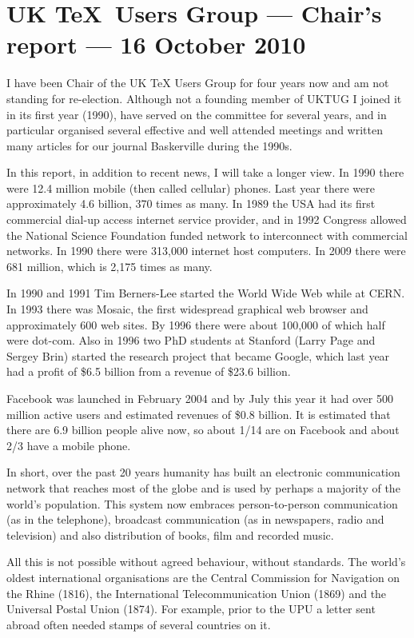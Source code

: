 \documentclass[11pt,a4paper]{article}
\begin{document}
\section*{UK \TeX\ Users Group --- Chair's report --- 16 October 2010}


I have been Chair of the UK TeX Users Group for four years now and am
not standing for re-election.  Although not a founding member of UKTUG
I joined it in its first year (1990), have served on the committee for
several years, and in particular organised several effective and well
attended meetings and written many articles for our journal
Baskerville during the 1990s.

In this report, in addition to recent news, I will take a longer view.
In 1990 there were 12.4 million mobile (then called cellular) phones.
Last year there were approximately 4.6 billion, 370 times as many.  In
1989 the USA had its first commercial dial-up access internet service
provider, and in 1992 Congress allowed the National Science Foundation
funded network to interconnect with commercial networks.  In 1990
there were 313,000 internet host computers.  In 2009 there were 681
million, which is 2,175 times as many.

In 1990 and 1991 Tim Berners-Lee started the World Wide Web while at
CERN.  In 1993 there was Mosaic, the first widespread graphical web
browser and approximately 600 web sites. By 1996 there were about
100,000 of which half were dot-com.  Also in 1996 two PhD students at
Stanford (Larry Page and Sergey Brin) started the research project
that became Google, which last year had a profit of \$6.5 billion from
a revenue of \$23.6 billion.

Facebook was launched in February 2004 and by July this year it had
over 500 million active users and estimated revenues of \$0.8 billion.
It is estimated that there are 6.9 billion people alive now, so about
1/14 are on Facebook and about 2/3 have a mobile phone.

In short, over the past 20 years humanity has built an electronic
communication network that reaches most of the globe and is used by
perhaps a majority of the world's population.  This system now
embraces person-to-person communication (as in the telephone),
broadcast communication (as in newspapers, radio and television) and
also distribution of books, film and recorded music.

All this is not possible without agreed behaviour, without standards.
The world's oldest international organisations are the Central
Commission for Navigation on the Rhine (1816), the International
Telecommunication Union (1869) and the Universal Postal Union (1874).
For example, prior to the UPU a letter sent abroad often needed stamps
of several countries on it.
\end{document}
